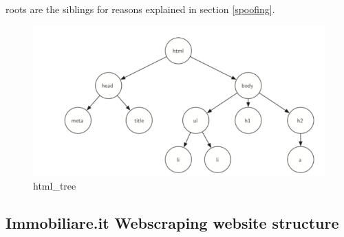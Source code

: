 \documentclass[
  12pt,
  a4paper,
  oneside]{book}
\theoremstyle{definition}
\theoremstyle{definition}
\theoremstyle{definition}
\theoremstyle{remark}
\begin{document}
roots are the siblings for reasons explained in section \ref{spoofing}.

\begin{figure}
\centering
\includegraphics{images/tree_html.PNG}
\caption{html\_tree}
\end{figure}

\hypertarget{webstructure}{%
\subsection{Immobiliare.it Webscraping website structure}\label{webstructure}}
\end{document}
